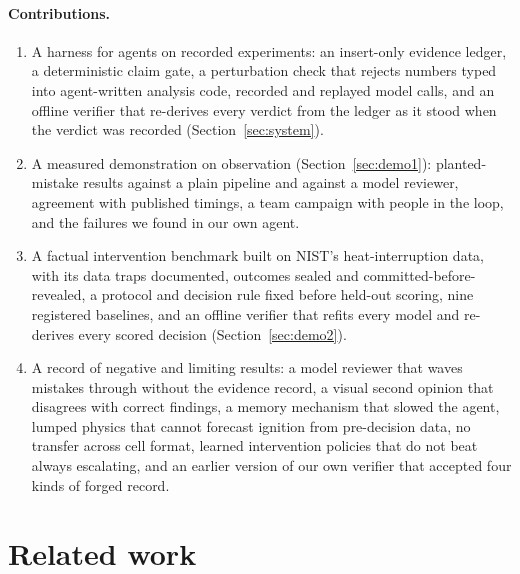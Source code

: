 \documentclass[11pt]{article}
\begin{document}
\paragraph{Contributions.}
\begin{enumerate}
  \item A harness for agents on recorded experiments: an insert-only evidence ledger, a deterministic claim gate, a
  perturbation check that rejects numbers typed into agent-written analysis code, recorded and replayed model calls,
  and an offline verifier that re-derives every verdict from the ledger as it stood when the verdict was recorded
  (Section~\ref{sec:system}).
  \item A measured demonstration on observation (Section~\ref{sec:demo1}): planted-mistake results against a plain
  pipeline and against a model reviewer, agreement with published timings, a team campaign with people in the loop,
  and the failures we found in our own agent.
  \item A factual intervention benchmark built on NIST's heat-interruption data, with its data traps documented,
  outcomes sealed and committed-before-revealed, a protocol and decision rule fixed before held-out scoring, nine
  registered baselines, and an offline verifier that refits every model and re-derives every scored decision
  (Section~\ref{sec:demo2}).
  \item A record of negative and limiting results: a model reviewer that waves mistakes through without the evidence
  record, a visual second opinion that disagrees with correct findings, a memory mechanism that slowed the agent,
  lumped physics that cannot forecast ignition from pre-decision data, no transfer across cell format, learned
  intervention policies that do not beat always escalating, and an earlier version of our own verifier that accepted
  four kinds of forged record.
\end{enumerate}

\section{Related work}\label{sec:related}
\end{document}
